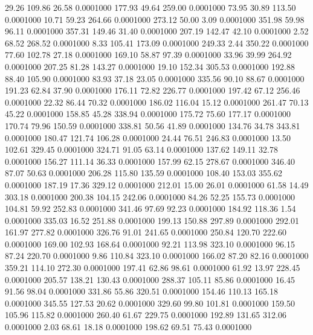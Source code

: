   29.26  109.86   26.58   0.0001000
 177.93   49.64  259.00   0.0001000
  73.95   30.89  113.50   0.0001000
  10.71   59.23  264.66   0.0001000
 273.12   50.00    3.09   0.0001000
 351.98   59.98   96.11   0.0001000
 357.31  149.46   31.40   0.0001000
 207.19  142.47   42.10   0.0001000
   2.52   68.52  268.52   0.0001000
   8.33  105.41  173.09   0.0001000
 249.33    2.44  350.22   0.0001000
  77.60  102.78   27.18   0.0001000
 169.10   58.87   97.39   0.0001000
  33.96   39.99  264.92   0.0001000
 207.25   81.28  143.27   0.0001000
  19.10  152.34  305.53   0.0001000
 192.88   88.40  105.90   0.0001000
  83.93   37.18   23.05   0.0001000
 335.56   90.10   88.67   0.0001000
 191.23   62.84   37.90   0.0001000
 176.11   72.82  226.77   0.0001000
 197.42   67.12  256.46   0.0001000
  22.32   86.44   70.32   0.0001000
 186.02  116.04   15.12   0.0001000
 261.47   70.13   45.22   0.0001000
 158.85   45.28  338.94   0.0001000
 175.72   75.60  177.17   0.0001000
 170.74   79.96  150.59   0.0001000
 338.81   50.56   41.89   0.0001000
 134.76   34.78  343.81   0.0001000
 180.47  121.74  106.28   0.0001000
  24.44   76.51  246.83   0.0001000
  13.50  102.61  329.45   0.0001000
 324.71   91.05   63.14   0.0001000
 137.62  149.11   32.78   0.0001000
 156.27  111.14   36.33   0.0001000
 157.99   62.15  278.67   0.0001000
 346.40   87.07   50.63   0.0001000
 206.28  115.80  135.59   0.0001000
 108.40  153.03  355.62   0.0001000
 187.19   17.36  329.12   0.0001000
 212.01   15.00   26.01   0.0001000
  61.58   14.49  303.18   0.0001000
 200.38  104.15  242.06   0.0001000
  84.26   52.25  155.73   0.0001000
 104.81   59.92  252.83   0.0001000
 341.46   97.69   92.23   0.0001000
 184.92  118.36    1.54   0.0001000
 335.03   16.52  251.88   0.0001000
 199.13  150.88  297.89   0.0001000
 292.01  161.97  277.82   0.0001000
 326.76   91.01  241.65   0.0001000
 250.84  120.70  222.60   0.0001000
 169.00  102.93  168.64   0.0001000
  92.21  113.98  323.10   0.0001000
  96.15   87.24  220.70   0.0001000
   9.86  110.84  323.10   0.0001000
 166.02   87.20   82.16   0.0001000
 359.21  114.10  272.30   0.0001000
 197.41   62.86   98.61   0.0001000
  61.92   13.97  228.45   0.0001000
 205.57  138.21  130.43   0.0001000
 288.37  105.11   85.86   0.0001000
  16.45   91.56   98.04   0.0001000
 331.86   55.86  320.51   0.0001000
 154.46  110.13  165.18   0.0001000
 345.55  127.53   20.62   0.0001000
 329.60   99.80  101.81   0.0001000
 159.50  105.96  115.82   0.0001000
 260.40   61.67  229.75   0.0001000
 192.89  131.65  312.06   0.0001000
   2.03   68.61   18.18   0.0001000
 198.62   69.51   75.43   0.0001000
